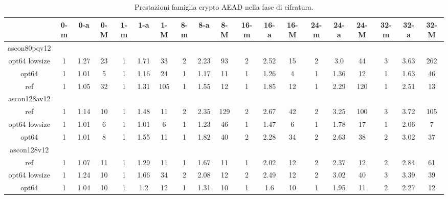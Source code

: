 \documentclass[12pt,a4paper,italian]{report}
\begin{document}
\begin{landscape}
    \begin{table}[]
        \caption{Prestazioni famiglia crypto AEAD nella fase di cifratura.}
        \begin{adjustbox}{width=600pt}
            \centering
			\begin{tabular}{|c|c|c|c|c|c|c|c|c|c|c|c|c|c|c|c|c|c|c|}
				\hline
				& 0-m & 0-a & 0-M & 1-m & 1-a & 1-M & 8-m & 8-a & 8-M & 16-m & 16-a & 16-M & 24-m & 24-a & 24-M & 32-m & 32-a & 32-M \\
				\hline
				ascon80pqv12 & & & & & & & & & & & & & & & & & & \\
				\hline
				opt64 lowsize & 1 & 1.27 & 23 & 1 & 1.71 & 33 & 2 & 2.23 & 93 & 2 & 2.52 & 15 & 2 & 3.0 & 44 & 3 & 3.63 & 262 \\
				\hline
				opt64 & 1 & 1.01 & 5 & 1 & 1.16 & 24 & 1 & 1.17 & 11 & 1 & 1.26 & 4 & 1 & 1.36 & 12 & 1 & 1.63 & 46 \\
				\hline
				ref & 1 & 1.05 & 32 & 1 & 1.31 & 105 & 1 & 1.55 & 12 & 1 & 1.85 & 12 & 1 & 2.29 & 120 & 1 & 2.51 & 13 \\
				\hline
				ascon128av12 & & & & & & & & & & & & & & & & & & \\
				\hline
				ref & 1 & 1.14 & 10 & 1 & 1.48 & 11 & 2 & 2.35 & 129 & 2 & 2.67 & 42 & 2 & 3.25 & 100 & 3 & 3.72 & 105 \\
				\hline
				opt64 lowsize & 1 & 1.01 & 6 & 1 & 1.01 & 6 & 1 & 1.23 & 46 & 1 & 1.47 & 6 & 1 & 1.78 & 17 & 1 & 2.06 & 7 \\
				\hline
				opt64 & 1 & 1.01 & 8 & 1 & 1.55 & 11 & 1 & 1.82 & 40 & 2 & 2.28 & 34 & 2 & 2.63 & 38 & 2 & 3.02 & 37 \\
				\hline
				ascon128v12 & & & & & & & & & & & & & & & & & & \\
				\hline
				ref & 1 & 1.07 & 11 & 1 & 1.29 & 11 & 1 & 1.67 & 11 & 1 & 2.02 & 12 & 2 & 2.37 & 12 & 2 & 2.84 & 61 \\
				\hline
				opt64 lowsize & 1 & 1.24 & 10 & 1 & 1.66 & 34 & 2 & 2.08 & 12 & 2 & 2.49 & 12 & 2 & 3.02 & 40 & 3 & 3.39 & 39 \\
				\hline
				opt64 & 1 & 1.04 & 10 & 1 & 1.2 & 12 & 1 & 1.31 & 10 & 1 & 1.6 & 10 & 1 & 1.95 & 11 & 2 & 2.27 & 12 \\
				\hline
			\end{tabular}
		\end{adjustbox}
	\end{table}
\end{landscape}
\end{document}
